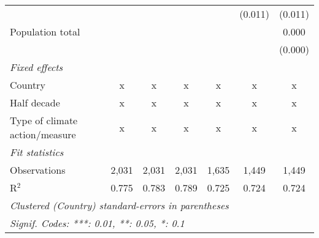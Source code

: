 \begin{tabular}{lcccccc}
                                                                                              &         &               &                &                & (0.011)       & (0.011)\\   
   Population total                                                                           &         &               &                &                &               & 0.000\\   
                                                                                              &         &               &                &                &               & (0.000)\\   
   \emph{Fixed effects}\\
   Country                                                                                    & x       & x             & x              & x              & x             & x\\  
   Half decade                                                                                & x       & x             & x              & x              & x             & x\\  
   Type of climate action/measure                                                             & x       & x             & x              & x              & x             & x\\  
   \midrule \emph{Fit statistics}\\
   Observations                                                                               & 2,031   & 2,031         & 2,031          & 1,635          & 1,449         & 1,449\\  
   R$^2$                                                                                      & 0.775   & 0.783         & 0.789          & 0.725          & 0.724         & 0.724\\  
   \midrule
   \multicolumn{7}{l}{\emph{Clustered (Country) standard-errors in parentheses}}\\
   \multicolumn{7}{l}{\emph{Signif. Codes: ***: 0.01, **: 0.05, *: 0.1}}\\
\end{tabular}
\par\endgroup


